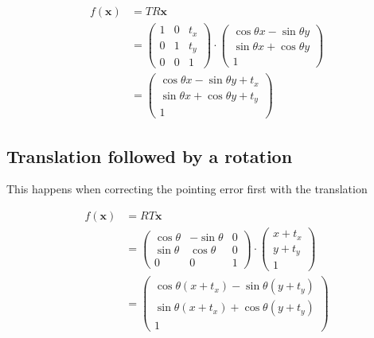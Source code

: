 \documentclass[paper=a4, fontsize=11pt]{article}
\begin{document}
\begin{align*}
	f(\bm{x}) &= TR\bm{x} \\
	&=
		\begin{pmatrix}
			1 & 0 & t_x \\
			0 & 1 & t_y \\
			0 & 0 & 1
		\end{pmatrix}
		\cdot
		\begin{pmatrix}
			\cos \theta x - \sin \theta y \\
			\sin \theta x + \cos \theta y \\
			1
		\end{pmatrix}
		\\
	&=
		\begin{pmatrix}
			\cos \theta x - \sin \theta y + t_x\\
			\sin \theta x + \cos \theta y + t_y\\
			1
		\end{pmatrix}
\end{align*}

\subsection{Translation followed by a rotation}
This happens when correcting the pointing error first with the translation

\begin{align*}
	f(\bm{x}) &= RT\bm{x} \\
	&=
		\begin{pmatrix}
			\cos \theta & -\sin \theta & 0 \\
			\sin \theta & \cos \theta & 0 \\
			0 & 0 & 1
		\end{pmatrix}
		\cdot
		\begin{pmatrix}
			x + t_x \\
			y + t_y \\
			1
		\end{pmatrix} \\
	&=
		\begin{pmatrix}
			\cos \theta (x + t_x) - \sin \theta (y + t_y)\\
			\sin \theta (x + t_x) + \cos \theta (y + t_y)\\
			1
		\end{pmatrix}
\end{align*}




\end{document}
